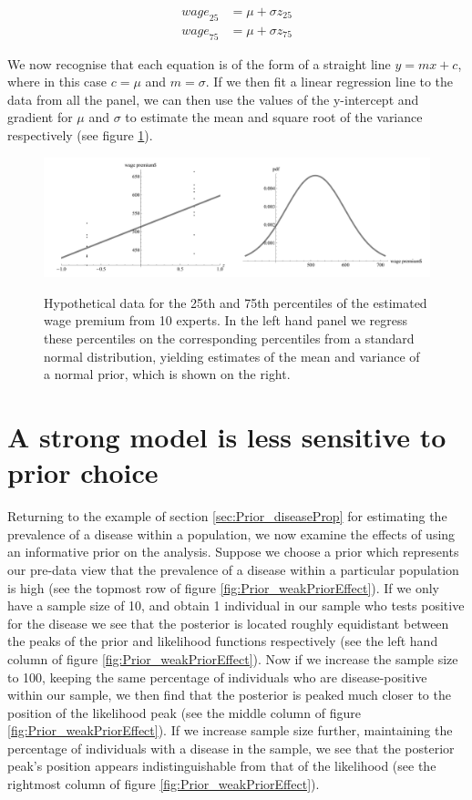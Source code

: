\documentclass[11pt,fullpage]{book}
\begin{document}
\begin{align}\label{eq:Prior_elicitingPriorNormalRegression}
{wage}_{25} &= \mu + \sigma z_{25}\\
{wage}_{75} &= \mu + \sigma z_{75}
\end{align}

We now recognise that each equation is of the form of a straight line $y = mx + c$, where in this case $c=\mu$ and $m=\sigma$. If we then fit a linear regression line to the data from all the panel, we can then use the values of the y-intercept and gradient for $\mu$ and $\sigma$ to estimate the mean and square root of the variance respectively (see figure \ref{fig:Prior_elicitingRegression}).

\begin{figure}
\centering
\scalebox{0.30} 
{\includegraphics{Prior_elicitingRegression.pdf}}\caption{Hypothetical data for the 25th and 75th percentiles of the estimated wage premium from 10 experts. In the left hand panel we regress these percentiles on the corresponding percentiles from a standard normal distribution, yielding estimates of the mean and variance of a normal prior, which is shown on the right.}\label{fig:Prior_elicitingRegression}
\end{figure}

\section{A strong model is less sensitive to prior choice}
Returning to the example of section \ref{sec:Prior_diseaseProp} for estimating the prevalence of a disease within a population, we now examine the effects of using an informative prior on the analysis. Suppose we choose a prior which represents our pre-data view that the prevalence of a disease within a particular population is high (see the topmost row of figure \ref{fig:Prior_weakPriorEffect}). If we only have a sample size of 10, and obtain 1 individual in our sample who tests positive for the disease we see that the posterior is located roughly equidistant between the peaks of the prior and likelihood functions respectively (see the left hand column of figure \ref{fig:Prior_weakPriorEffect}). Now if we increase the sample size to 100, keeping the same percentage of individuals who are disease-positive within our sample, we then find that the posterior is peaked much closer to the position of the likelihood peak (see the middle column of figure \ref{fig:Prior_weakPriorEffect}). If we increase sample size further, maintaining the percentage of individuals with a disease in the sample, we see that the posterior peak's position appears indistinguishable from that of the likelihood (see the rightmost column of figure \ref{fig:Prior_weakPriorEffect}). 
\end{document}
